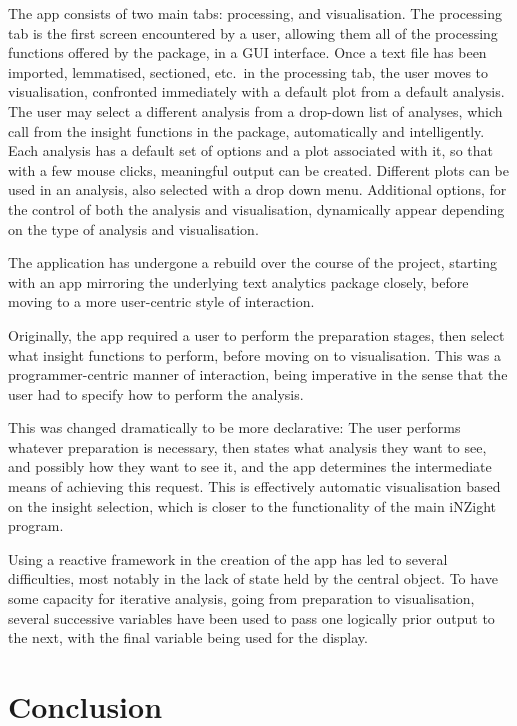 \documentclass[11pt, a4paper, twoside, titlepage]{report}
\begin{document}
The app consists of two main tabs: processing, and visualisation. The
processing tab is the first screen encountered by a user, allowing
them all of the processing functions offered by the package, in a GUI
interface. Once a text file has been imported, lemmatised, sectioned,
etc.\ in the processing tab, the user moves to visualisation,
confronted immediately with a default plot from a default analysis.
The user may select a different analysis from a drop-down list of
analyses, which call from the insight functions in the package,
automatically and intelligently. Each analysis has a default set of
options and a plot associated with it, so that with a few mouse
clicks, meaningful output can be created. Different plots can be used
in an analysis, also selected with a drop down menu. Additional
options, for the control of both the analysis and visualisation,
dynamically appear depending on the type of analysis and
visualisation.

The application has undergone a rebuild over the course of the project,
starting with an app mirroring the underlying text analytics package
closely, before moving to a more user-centric style of interaction.

Originally, the app required a user to perform the preparation stages,
then select what insight functions to perform, before moving on to
visualisation. This was a programmer-centric manner of interaction,
being imperative in the sense that the user had to specify how to
perform the analysis.

This was changed dramatically to be more declarative: The user
performs whatever preparation is necessary, then states what analysis
they want to see, and possibly how they want to see it, and the app
determines the intermediate means of achieving this request. This is
effectively automatic visualisation based on the insight selection,
which is closer to the functionality of the main iNZight program.

Using a reactive framework in the creation of the app has led to
several difficulties, most notably in the lack of state held by the
central object. To have some capacity for iterative analysis, going
from preparation to visualisation, several successive variables have
been used to pass one logically prior output to the next, with the
final variable being used for the display.

\chapter{Conclusion}\label{cha:conclusion}
\end{document}
